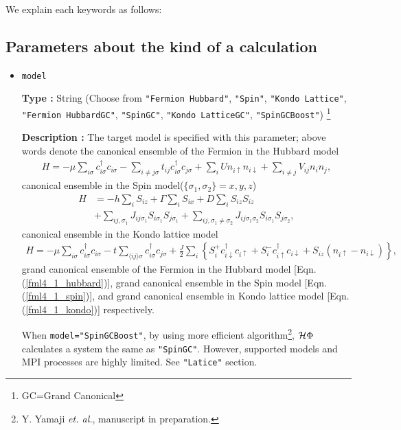We explain each keywords as follows:

\subsection{Parameters about the kind of a calculation}

\begin{itemize}

\item \verb|model|

{\bf Type :} String (Choose from \verb|"Fermion Hubbard"|, \verb|"Spin"|, \verb|"Kondo Lattice"|, 
\verb|"Fermion HubbardGC"|, \verb|"SpinGC"|, \verb|"Kondo LatticeGC"|, \verb|"SpinGCBoost"|)
\footnote{GC=Grand Canonical}

{\bf Description :} The target model is specified with this parameter;
above words denote the canonical ensemble of the Fermion in the Hubbard model
\begin{align}
H = -\mu \sum_{i \sigma} c^\dagger_{i \sigma} c_{i \sigma} 
- \sum_{i \neq j \sigma} t_{i j} c^\dagger_{i \sigma} c_{j \sigma} 
+ \sum_{i} U n_{i \uparrow} n_{i \downarrow}
+ \sum_{i \neq j} V_{i j} n_{i} n_{j},
\label{fml4_1_hubbard}
\end{align}
canonical ensemble in the Spin model($\{\sigma_1, \sigma_2\}={x, y, z}$)
\begin{align}
H &= -h \sum_{i} S_{i z} + \Gamma \sum_{i} S_{i x} + D \sum_{i} S_{i z} S_{i z}
\nonumber \\
&+ \sum_{i j, \sigma_1}J_{i j \sigma_1} S_{i \sigma_1} S_{j \sigma_1}+ \sum_{i j, \sigma_1 \neq \sigma_2} J_{i j \sigma_1 \sigma_2} S_{i \sigma_1} S_{j \sigma_2} ,
\label{fml4_1_spin}
\end{align}
canonical ensemble in the Kondo lattice model
\begin{align}
H = - \mu \sum_{i \sigma} c^\dagger_{i \sigma} c_{i \sigma} 
- t \sum_{\langle i j \rangle \sigma} c^\dagger_{i \sigma} c_{j \sigma} 
+ \frac{J}{2} \sum_{i} \left\{
S_{i}^{+} c_{i \downarrow}^\dagger c_{i \uparrow}
+ S_{i}^{-} c_{i \uparrow}^\dagger c_{i \downarrow}
+ S_{i z} (n_{i \uparrow} - n_{i \downarrow})
\right\},
\label{fml4_1_kondo}
\end{align}
grand canonical ensemble of the Fermion in the Hubbard model [Eqn. (\ref{fml4_1_hubbard})],
grand canonical ensemble in the Spin model [Eqn. (\ref{fml4_1_spin})],
and
grand canonical ensemble in Kondo lattice model [Eqn. (\ref{fml4_1_kondo})]
respectively.

When \verb|model="SpinGCBoost"|,
by using more efficient algorithm\footnote{Y. Yamaji \textit{et. al.}, manuscript in preparation.}, 
$\mathcal{H} \Phi$ calculates a system the same as \verb|"SpinGC"|.
However, supported models and MPI processes are highly limited.
See \verb|"Latice"| section.


\end{itemize}
